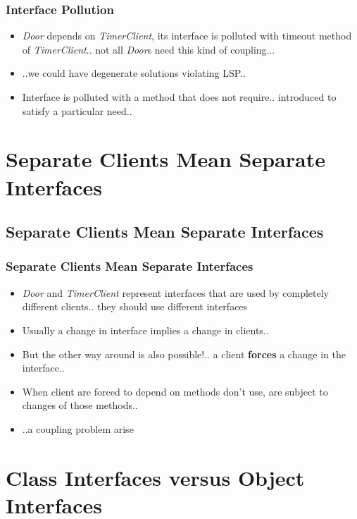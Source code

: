 \documentclass{beamer}
\begin{document}
\begin{frame}
  \frametitle{Interface Pollution}
  \begin{itemize}
	\item<+-> \textit{Door} depends on \textit{TimerClient}, its interface is polluted with timeout method of \textit{TimerClient}.. not all \textit{Door}s need this kind of coupling... 
	\item<+-> ..we could have degenerate solutions violating LSP..\\
	\item<+-> Interface is polluted with a method that does not require.. introduced to satisfy a particular need..
   \end{itemize}
\end{frame}

\section{Separate Clients Mean Separate Interfaces}
\subsection{Separate Clients Mean Separate Interfaces}
\begin{frame}
  \frametitle{Separate Clients Mean Separate Interfaces}
  \begin{itemize}
	\item<+-> \textit{Door} and \textit{TimerClient} represent interfaces that are used by completely different clients.. they should use different interfaces 
	\item<+-> Usually a change in interface implies a change in clients..
	\item<+-> But the other way around is also possible!.. a client \textbf{forces} a change in the interface..
	\item<+-> When client are forced to depend on methods don't use, are subject to changes of those methods..
	\item<+-> ..a coupling problem arise
   \end{itemize}
\end{frame}

\section{Class Interfaces versus Object Interfaces}
\end{document}

